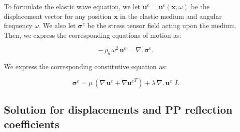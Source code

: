 \documentclass[draft]{agujournal2019}
\begin{document}
To formulate the elastic wave equation, we let $\bm{u}^e=\bm{u}^e (\bm{x},\omega)$ be the displacement vector for any position $\bm{x}$ in the elastic medium and angular frequency $\omega$. We also let $\bm{\sigma}^e$ be the stress tensor field acting upon the medium. Then, we express the corresponding equations of motion as:
\begin{linenomath*}
\begin{equation}\label{Eq.6}
- \, \rho_b \,\omega^2 \, \mathbf{u}^e = \nabla . \, \bm{\sigma}^e.
\end{equation}
\end{linenomath*}
We express the corresponding constitutive equation as: 
\begin{linenomath*}
\begin{equation}\label{Eq.7}
\bm{\sigma}^e = \mu \,  \left( \nabla \, \bm{u}^e + {\nabla  \bm{u}^e}^T  \right) + \lambda \,  \nabla . \, \bm{u}^e\,\, I.
\end{equation}
\end{linenomath*}
 

\subsection{Solution for displacements and PP reflection coefficients}
\end{document}
